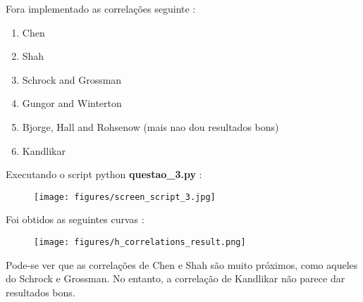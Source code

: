 \documentclass[a4paper, 11pt]{article}
\begin{document}
Fora implementado as correlações seguinte :
\begin{enumerate}
  \item Chen
  \item Shah
  \item Schrock and Grossman
  \item Gungor and Winterton
  \item Bjorge, Hall and Rohsenow (mais nao dou resultados bons)
  \item Kandlikar
\end{enumerate}

Executando o script python \textbf{questao\_3.py} :
\begin{figure}[H]
  \begin{center}
  \texttt{[image: figures/screen\_script\_3.jpg]}  
\end{center} \end{figure}
Foi obtidos as seguintes curvas :

\begin{figure}[H]
  \begin{center}
  \texttt{[image: figures/h\_correlations\_result.png]}  
\end{center} \end{figure}

Pode-se ver que as correlações de Chen e Shah são muito próximos, como aqueles do Schrock e Grossman. No entanto, a correlação de Kandlikar não parece dar resultados bons.
\end{document}
